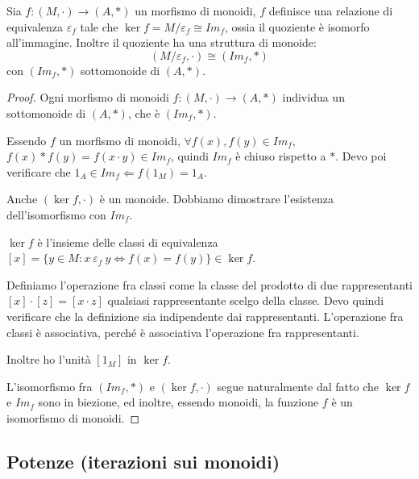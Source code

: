 \begin{prop}
Sia $f : (M, \cdot) \to (A, \ast)$ un morfismo di monoidi, $f$ definisce una relazione di equivalenza $\varepsilon_f$ tale che $\ker f = M / \varepsilon_f \cong Im_f$, ossia il quoziente \`e isomorfo all'immagine. Inoltre il quoziente ha una struttura di monoide:
\[
(M / \varepsilon_f , \cdot) \cong (Im_f, \ast)
\]
con $(Im_f, \ast)$ sottomonoide di $(A, \ast)$.
\end{prop}
\begin{proof}
Ogni morfismo di monoidi $f : (M, \cdot) \to (A, \ast)$ individua un sottomonoide di $(A, \ast)$, che \`e $(Im_f, \ast)$. 

Essendo $f$ un morfismo di monoidi, $\forall f(x), f(y) \in Im_f$, $f(x) \ast f(y) = f(x \cdot y) \in Im_f$, quindi $Im_f $ \`e chiuso rispetto a $\ast$. Devo poi verificare che $1_A \in Im_f \Leftarrow f(1_M) = 1_A$.

Anche $(\ker f, \cdot)$ \`e un monoide. Dobbiamo dimostrare l'esistenza dell'isomorfismo con $Im_f$.

$\ker f$ \`e l'insieme delle classi di equivalenza $[x] = \{ y \in M : x \ \varepsilon_f \ y \Leftrightarrow f(x) = f(y) \} \in \ker f$.

Definiamo l'operazione fra classi come la classe del prodotto di due rappresentanti $[x] \cdot [z] = [x \cdot z]$ qualsiasi rappresentante scelgo della classe. Devo quindi verificare che la definizione sia indipendente dai rappresentanti. L'operazione fra classi \`e associativa, perch\'e \`e associativa l'operazione fra rappresentanti.

Inoltre ho l'unit\`a $[1_M]$ in $\ker f$.

L'isomorfismo fra $(Im_f, \ast)$ e $(\ker f, \cdot)$ segue naturalmente dal fatto che $\ker f $ e $Im_f$ sono in biezione, ed inoltre, essendo monoidi, la funzione $f$ \`e un isomorfismo di monoidi.
\end{proof}

\subsection{Potenze (iterazioni sui monoidi)}

